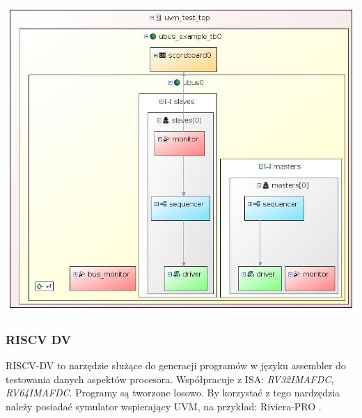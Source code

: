 \documentclass[11pt,a4paper]{article}
\begin{document}
			\begin{minipage}{\textwidth}
				\nopagebreak
				\begin{center}
					\includegraphics[width=14cm]{./rysunki/uvm_graph.jpg}
				\end{center}
			\end{minipage}
		\subsubsection{RISCV DV}
		\hspace{5mm}
			RISCV-DV to narzędzie służące do generacji programów w języku assembler do testowania danych aspektów procesora. Współpracuje z ISA: \textit{RV32IMAFDC, RV64IMAFDC}. Programy są tworzone losowo. By korzystać z tego nardzędzia należy posiadać symulator wspierający UVM, na przykład: Riviera-PRO \cite{google_dv}.
\end{document}
